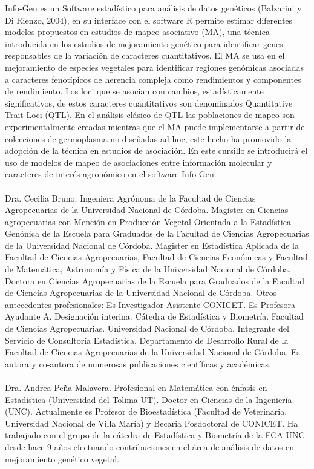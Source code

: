 \noindent Info-Gen es un Software estadístico para análisis de datos genéticos (Balzarini y Di Rienzo, 2004), en su interface con el software R permite estimar diferentes modelos propuestos en estudios de mapeo asociativo (MA), una técnica introducida en los estudios de mejoramiento genético para identificar genes responsables de la variación de caracteres cuantitativos. El MA se usa en el mejoramiento de especies vegetales para identificar regiones genómicas asociadas a caracteres fenotípicos de herencia compleja como rendimientos y componentes de rendimiento. Los loci que se asocian con cambios, estadísticamente significativos, de estos caracteres cuantitativos son denominados Quantitative Trait Loci (QTL). En el análisis clásico de QTL las poblaciones de mapeo son experimentalmente creadas mientras que el MA puede implementarse a partir de colecciones de germoplasma no diseñadas ad-hoc, este hecho ha promovido la adopción de la técnica en estudios de asociación. En este cursillo se introducirá el uso de modelos de mapeo de asociaciones entre información molecular y caracteres de interés agronómico en el software Info-Gen. \\ \\

\noindent \small{Dra. Cecilia Bruno. Ingeniera Agrónoma de la Facultad de Ciencias Agropecuarias de la Universidad Nacional de Córdoba. Magister en Ciencias agropecuarias con Mención en Producción Vegetal Orientada a la Estadística Genónica de la Escuela para Graduados de la Facultad de Ciencias Agropecuarias de la Universidad Nacional de Córdoba. Magister en Estadística Aplicada de la Facultad de Ciencias Agropecuarias, Facultad de Ciencias Económicas y Facultad de Matemática, Astronomía y Física de la Universidad Nacional de Córdoba. Doctora en Ciencias Agropecuarias de la Escuela para Graduados de la Facultad de Ciencias Agropecuarias de la Universidad Nacional de Córdoba. Otros antecedentes profesionales: Es Investigador Asistente CONICET. Es Profesora Ayudante A. Designación interina. Cátedra de Estadística y Biometría. Facultad de Ciencias Agropecuarias. Universidad Nacional de Córdoba. Integrante del Servicio de Consultoría Estadística. Departamento de Desarrollo Rural de la Facultad de Ciencias Agropecuarias de la Universidad Nacional de Córdoba. Es autora y co-autora de numerosas publicaciones científicas y académicas.} \\ \\
\noindent \small{Dra. Andrea Peña Malavera. Profesional en Matemática con énfasis en Estadística (Universidad del Tolima-UT). Doctor en Ciencias de la Ingeniería (UNC). Actualmente es Profesor de Bioestadística (Facultad de Veterinaria, Universidad Nacional de Villa María) y Becaria Posdoctoral de CONICET. Ha trabajado con el grupo de la cátedra de Estadística y Biometría de la FCA-UNC desde hace 9 años efectuando contribuciones en el área de análisis de datos en mejoramiento genético vegetal.}

